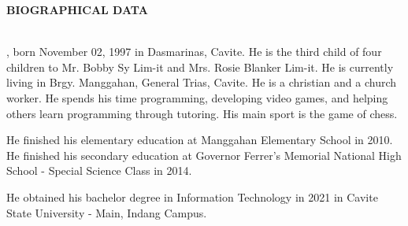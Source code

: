 \begin{doublespace}
	\thispagestyle{empty}

	\begin{center}
		\textbf{BIOGRAPHICAL DATA}
	\end{center}
	\leavevmode\\


	\justify
	\textbf{}, born November 02, 1997 in Dasmarinas, Cavite.
	He is the third child of four children to Mr. Bobby Sy Lim-it and Mrs.
	Rosie Blanker Lim-it. He is currently living in Brgy. Manggahan, General
	Trias, Cavite. He is a christian and a church worker. He spends his time
	programming, developing video games, and helping others learn programming through
	tutoring. His main sport is the game of chess.

	\parx
	He finished his elementary education at Manggahan Elementary School in 2010.
	He finished his secondary education at Governor Ferrer's Memorial National
	High School - Special Science Class in 2014.

	\parx
	He obtained his bachelor degree in Information Technology in 2021 in Cavite
	State University - Main, Indang Campus.
\end{doublespace}
